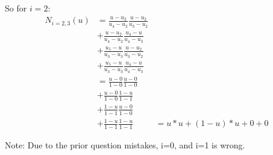 
So for $i=2$:
\begin{align*}
N_{i=2,3}(u)
            &= \frac {u - u_{2}} {u_{4} - u_{2}} \frac{u - u_{2}} {u_{3} - u_{2}} \\
            &+ \frac {u - u_{2}} {u_{4} - u_{2}}  \frac{u_{4} - u } { u_{4} - u_{3}} \\
            &+ \frac {u_{5} - u} { u_{3} - u_{3}} \frac {u - u_{2}} {u_{3} - u_{2}} \\
            &+ \frac {u_{5} - u} { u_{3} - u_{3}} \frac{u_{4} - u } { u_{4} - u_{3} } \\
            &= \frac {u - 0} {1 - 0} \frac{u - 0} {1 - 0} \\
            &+ \frac {u - 0} {1 - 0} \frac{1 - u } { 1 - 1} \\
            &+ \frac {1 - u} { 1 - 1} \frac {u - 0} {1 - 0} \\
            &+ \frac {1 - u} { 1 - 1} \frac{1 - u } {1 - 1} 
            &= u*u + (1-u)*u + 0 + 0
\end{align*}


Note: Due to the prior question mistakes, i=0, and i=1 is wrong.
